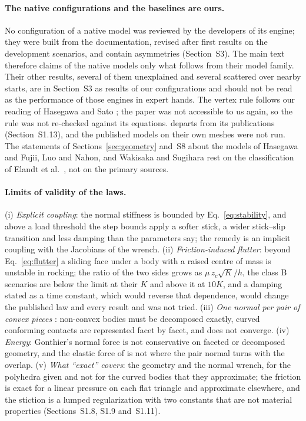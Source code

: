 \paragraph{The native configurations and the baselines are ours.} No configuration of a native
model was reviewed by the developers of its engine; they were built from the documentation,
revised after first results on the development scenarios, and contain asymmetries (Section~S3).
The main text therefore claims of the native models only what follows from their model family.
Their other results, several of them unexplained and several scattered over nearby starts, are
in Section~S3 as results of our configurations and should not be read as the performance of
those engines in expert hands. The vertex rule follows our reading of Hasegawa and Sato
\cite{Hasegawa2004}; the paper was not accessible to us again, so the rule was not re-checked
against its equations.  departs from its publications (Section~S1.13), and the
published models on their own meshes were not run. The statements of
Sections~\ref{sec:geometry} and~S8 about the models of Hasegawa and Fujii, Luo and Nahon, and Wakisaka
and Sugihara rest on the classification of Elandt et al.~\cite{Elandt2019}, not on the primary
sources.

\paragraph{Limits of validity of the laws.} (i) \emph{Explicit coupling}: the normal stiffness
is bounded by Eq.~\eqref{eq:stability}, and above a load threshold the step bounds apply a
softer stick, a wider stick--slip transition and less damping than the parameters say; the
remedy is an implicit coupling with the Jacobians of the wrench. (ii) \emph{Friction-induced
flutter}: beyond Eq.~\eqref{eq:flutter} a sliding face under a body with a raised centre of
mass is unstable in rocking; the ratio of the two sides grows as $\mu\,z_c\sqrt{K}/h$, the
class B scenarios are below the limit at their $K$ and above it at $10K$, and a damping stated
as a time constant, which would reverse that dependence, would change the published law and
every result and was not tried. (iii) \emph{One normal per pair of convex pieces}
\cite{Elandt2019}: non-convex bodies must be decomposed exactly, curved conforming contacts are
represented facet by facet, and  does not converge. (iv) \emph{Energy}: Gonthier's
normal force is not conservative on faceted or decomposed geometry, and the elastic force of
 is not where the pair normal turns with the overlap. (v) \emph{What ``exact''
covers}: the geometry and the normal wrench, for the polyhedra given and not for the curved
bodies that they approximate; the friction is exact for a linear pressure on each flat triangle
and approximate elsewhere, and the stiction is a lumped regularization with two constants that
are not material properties (Sections~S1.8, S1.9 and~S1.11).

